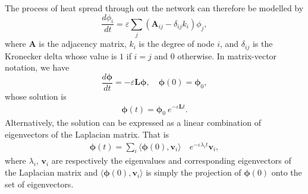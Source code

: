 \documentclass[10pt,a4paper]{article}
\begin{document}
    	The process of heat spread through out the network can therefore be modelled by
    	\begin{equation}
    	\frac{d\phi_i}{dt} = \varepsilon \sum_j (\mathbf{A}_{ij} - \delta_{ij} k_i) \phi_j,
    	\label{difusion}
    	\end{equation}
    	where $\mathbf{A}$ is the adjacency matrix, $k_i$ is the degree of node $i$, and $\delta_{ij}$ is the Kronecker delta whose value is $1$ if $i=j$ and $0$ otherwise. In matrix-vector notation, we have
    	\begin{equation}
    	\frac{d\boldsymbol{\phi}}{dt} = -\varepsilon\mathbf{L}\boldsymbol{\phi}, \quad \boldsymbol{\phi}(0) = \boldsymbol{\phi}_0 ,
    	\label{dif-final-eqn}
    	\end{equation}
    	whose solution is 
    	\begin{eqnarray}
    	\boldsymbol{\phi}(t) = \boldsymbol{\phi}_0~e^{-\varepsilon\mathbf{L}t}.
    	\end{eqnarray}
    	Alternatively, the solution can be expressed as a linear combination of eigenvectors of the Laplacian matrix. That is
    	 \begin{eqnarray*}
    	 	\boldsymbol{\phi}(t) = \sum_i \langle \boldsymbol{\phi}(0),\mathbf{v}_i \rangle \quad e^{-\varepsilon\lambda_i t} \mathbf{v}_i,  
    	 \end{eqnarray*}
    	 where $\lambda_i$, $\mathbf{v}_i$ are respectively the eigenvalues and corresponding eigenvectors of the Laplacian matrix and $\langle \boldsymbol{\phi}(0),\mathbf{v}_i \rangle$ is simply the projection of $\boldsymbol{\phi}(0)$ onto the set of eigenvectors.
    	 
\end{document}
